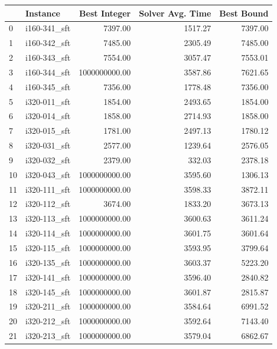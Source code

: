 \begin{tabular}{llrrr}
\toprule
{} &      Instance &  Best Integer &  Solver Avg. Time &  Best Bound \\
\midrule
0  &  i160-341\_sft &       7397.00 &           1517.27 &     7397.00 \\
1  &  i160-342\_sft &       7485.00 &           2305.49 &     7485.00 \\
2  &  i160-343\_sft &       7554.00 &           3057.47 &     7553.01 \\
3  &  i160-344\_sft & 1000000000.00 &           3587.86 &     7621.65 \\
4  &  i160-345\_sft &       7356.00 &           1778.48 &     7356.00 \\
5  &  i320-011\_sft &       1854.00 &           2493.65 &     1854.00 \\
6  &  i320-014\_sft &       1858.00 &           2714.93 &     1858.00 \\
7  &  i320-015\_sft &       1781.00 &           2497.13 &     1780.12 \\
8  &  i320-031\_sft &       2577.00 &           1239.64 &     2576.05 \\
9  &  i320-032\_sft &       2379.00 &            332.03 &     2378.18 \\
10 &  i320-043\_sft & 1000000000.00 &           3595.60 &     1306.13 \\
11 &  i320-111\_sft & 1000000000.00 &           3598.33 &     3872.11 \\
12 &  i320-112\_sft &       3674.00 &           1833.20 &     3673.13 \\
13 &  i320-113\_sft & 1000000000.00 &           3600.63 &     3611.24 \\
14 &  i320-114\_sft & 1000000000.00 &           3601.75 &     3601.64 \\
15 &  i320-115\_sft & 1000000000.00 &           3593.95 &     3799.64 \\
16 &  i320-135\_sft & 1000000000.00 &           3603.37 &     5223.20 \\
17 &  i320-141\_sft & 1000000000.00 &           3596.40 &     2840.82 \\
18 &  i320-145\_sft & 1000000000.00 &           3601.87 &     2815.87 \\
19 &  i320-211\_sft & 1000000000.00 &           3584.64 &     6991.52 \\
20 &  i320-212\_sft & 1000000000.00 &           3592.64 &     7143.40 \\
21 &  i320-213\_sft & 1000000000.00 &           3579.04 &     6862.67 \\

\end{tabular}
